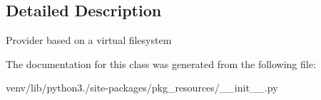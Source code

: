 \subsection{Detailed Description}
\begin{DoxyVerb}Provider based on a virtual filesystem\end{DoxyVerb}
 

The documentation for this class was generated from the following file\+:\begin{DoxyCompactItemize}
\item 
venv/lib/python3./site-\/packages/pkg\+\_\+resources/\+\_\+\+\_\+init\+\_\+\+\_\+.\+py\end{DoxyCompactItemize}
